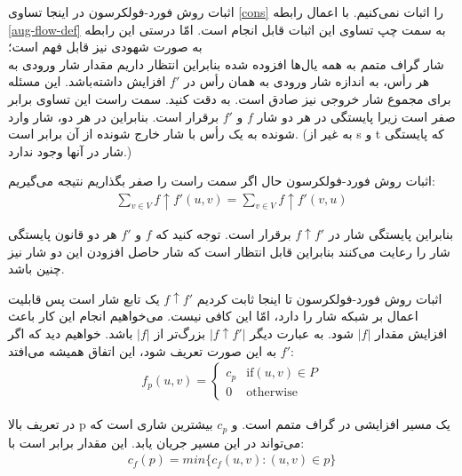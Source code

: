 \begin{itemframe}{اثبات روش فورد-فولکرسون}
\itm
در اینجا تساوی \ref{cons} را اثبات نمی‌کنیم. با اعمال رابطه \ref{aug-flow-def} به سمت چپ تساوی این اثبات قابل انجام است. امّا درستی این رابطه به صورت شهودی نیز قابل فهم است؛
\\
شار گراف متمم به همه یال‌ها افزوده شده بنابراین انتظار داریم مقدار شار ورودی به هر رأس، به اندازه شار ورودی به همان رأس در
$f'$
افزایش داشته‌باشد. این مسئله برای مجموع شار خروجی نیز صادق است.
\itm
به
دقت کنید. سمت راست این تساوی برابر صفر است زیرا پایستگی در هر دو شار
$f$
و
$f'$
برقرار است. بنابراین در هر دو، شار وارد شونده به یک رأس با شار خارج شونده از آن برابر است. (به غیر از s و t که پایستگی شار در آنها وجود ندارد.)
\end{itemframe}
\begin{itemframe}{اثبات روش فورد-فولکرسون}
\itm
حال اگر سمت راست  را صفر بگذاریم نتیجه می‌گیریم:
\begin{align*}
\sum_{v\in V} f \uparrow f'(u, v)  = \sum_{v\in V} f \uparrow f'(v, u)
\end{align*}

\itm
بنابراین پایستگی شار در
$ f \uparrow f'$
برقرار است. توجه کنید که
$f$
و
$f'$
هر دو قانون پایستگی شار را رعایت می‌کنند بنابراین قابل انتظار است که شار حاصل افزودن این دو شار نیز چنین باشد.
\end{itemframe}
\begin{itemframe}{اثبات روش فورد-فولکرسون}
\itm
تا اینجا ثابت کردیم
$ f \uparrow f'$
یک تابع شار است پس قابلیت اعمال بر شبکه شار را دارد، امّا این کافی نیست. می‌خواهیم انجام این کار باعث افزایش مقدار
$|f|$
شود. به عبارت دیگر
$|f \uparrow f'|$
بزرگ‌تر از
$|f|$
باشد.
\itm
خواهیم دید که اگر
$f'$
به این صورت تعریف شود، این اتفاق همیشه می‌افتد:
\begin{align}
f_p(u, v)=
\begin{cases}
c_p& \text{if} (u, v) \in P\\
0 &\text{otherwise}
\end{cases}
\label{aug-path}
\end{align}


\itm
در تعریف بالا p یک مسیر افزایشی در گراف متمم است. و
$c_p$
بیشترین شاری است که می‌تواند در این مسیر جریان یابد. این مقدار برابر است با:
\begin{align}
c_f(p) = min \{c_f(u, v): (u, v) \in p\}
\label{path-cap}
\end{align}

\end{itemframe}
